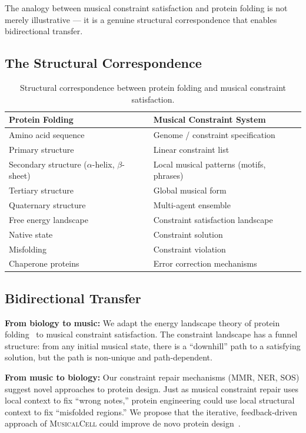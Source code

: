 \documentclass[11pt,a4paper]{article}
\newcommand{\MusicalCell}{\textsc{MusicalCell}}
\begin{document}
The analogy between musical constraint satisfaction and protein folding is not merely illustrative --- it is a genuine structural correspondence that enables bidirectional transfer.

\subsection{The Structural Correspondence}

\begin{table}[h]
\centering
\begin{tabular}{@{}ll@{}}
\toprule
\textbf{Protein Folding} & \textbf{Musical Constraint System} \\
\midrule
Amino acid sequence & Genome / constraint specification \\
Primary structure & Linear constraint list \\
Secondary structure ($\alpha$-helix, $\beta$-sheet) & Local musical patterns (motifs, phrases) \\
Tertiary structure & Global musical form \\
Quaternary structure & Multi-agent ensemble \\
Free energy landscape & Constraint satisfaction landscape \\
Native state & Constraint solution \\
Misfolding & Constraint violation \\
Chaperone proteins & Error correction mechanisms \\
\bottomrule
\end{tabular}
\caption{Structural correspondence between protein folding and musical constraint satisfaction.}
\label{tab:folding}
\end{table}

\subsection{Bidirectional Transfer}

\textbf{From biology to music:} We adapt the energy landscape theory of protein folding~\citep{bryngelson1995} to musical constraint satisfaction. The constraint landscape has a funnel structure: from any initial musical state, there is a ``downhill'' path to a satisfying solution, but the path is non-unique and path-dependent.

\textbf{From music to biology:} Our constraint repair mechanisms (MMR, NER, SOS) suggest novel approaches to protein design. Just as musical constraint repair uses local context to fix ``wrong notes,'' protein engineering could use local structural context to fix ``misfolded regions.'' We propose that the iterative, feedback-driven approach of \MusicalCell{} could improve de novo protein design~\citep{huang2016}.
\end{document}
